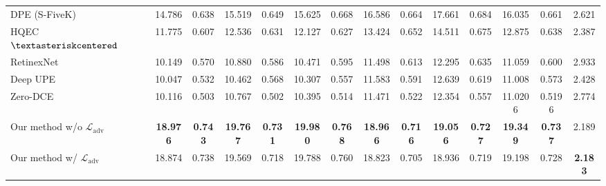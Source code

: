 \documentclass[final]{cvpr}
\begin{document}
\begin{table*}
\begin{center}
{\begin{tabular}{|l|c|c|c|c|c|c|c|c|c|c|c|c|c|}
DPE (S-FiveK) \cite{DPE} & 14.786 & 0.638 & 15.519 & 0.649 & 15.625 &  0.668 & 16.586 & 0.664 &  17.661 & 0.684 & 16.035 & 0.661 & 2.621\\
\cellcolor[HTML]{D5D5D5}HQEC \cite{HQEC} $\textasteriskcentered$& 11.775 & 0.607 & 12.536 & 0.631 & 12.127 & 0.627 & 13.424 & 0.652 & 14.511 & 0.675 & 12.875 & 0.638 & 2.387\\
\cellcolor[HTML]{D5D5D5}RetinexNet \cite{Chen2018Retinex} & 10.149 & 0.570 & 10.880 & 0.586 & 10.471 & 0.595 & 11.498 & 0.613 & 12.295 & 0.635 & 11.059 & 0.600 & 2.933\\
\cellcolor[HTML]{D5D5D5}Deep UPE \cite{DeepUPE} & 10.047 & 0.532 & 10.462 & 0.568 & 10.307 & 0.557 & 11.583 & 0.591 & 12.639 & 0.619 & 11.008 & 0.573 & 2.428\\
\cellcolor[HTML]{D5D5D5}Zero-DCE \cite{guo2020zero}  & 10.116 & 0.503 & 10.767 & 0.502 & 10.395 & 0.514 & 11.471 & 0.522 & 12.354 & 0.557 & 11.0206 & 0.5196 & 2.774 \\
\hdashline
Our method w/o $\mathcal{L}_{\text{adv}}$ & \cellcolor[HTML]{79CC7A}\textbf{18.976} & \cellcolor[HTML]{79CC7A}\textbf{0.743} & \cellcolor[HTML]{79CC7A}\textbf{19.767} & \cellcolor[HTML]{79CC7A}\textbf{0.731} & \cellcolor[HTML]{79CC7A}\textbf{19.980} & \cellcolor[HTML]{79CC7A}\textbf{0.768} & \cellcolor[HTML]{79CC7A}\textbf{18.966} & \cellcolor[HTML]{79CC7A}\textbf{0.716} & \cellcolor[HTML]{79CC7A}\textbf{19.056} & \cellcolor[HTML]{79CC7A}\textbf{0.727} & \cellcolor[HTML]{79CC7A}\textbf{19.349} & \cellcolor[HTML]{79CC7A}\textbf{0.737} & \cellcolor[HTML]{FFFBA3}2.189\\
Our method w/ $\mathcal{L}_{\text{adv}}$ & \cellcolor[HTML]{FFFBA3}18.874 & \cellcolor[HTML]{FFFBA3}0.738 & \cellcolor[HTML]{FFFBA3}19.569 & \cellcolor[HTML]{FFFBA3}0.718 & \cellcolor[HTML]{FFFBA3}19.788 & \cellcolor[HTML]{FFFBA3}0.760 & \cellcolor[HTML]{FFFBA3}18.823 & \cellcolor[HTML]{FFFBA3}0.705 & \cellcolor[HTML]{FFFBA3}18.936 & \cellcolor[HTML]{FFFBA3}0.719 & \cellcolor[HTML]{FFFBA3}19.198 & \cellcolor[HTML]{FFFBA3}0.728 & \cellcolor[HTML]{79CC7A}\textbf{2.183}\\\hline



\end{tabular}}
\end{center}
\end{table*}
\end{document}
